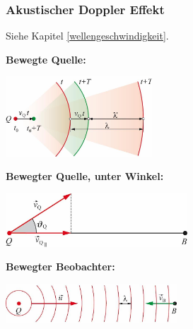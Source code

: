 \subsubsection{Akustischer Doppler Effekt}
 Siehe Kapitel \ref{wellengeschwindigkeit}.
\begin{center}
	\begin{minipage}{0.3\textwidth}
		\textbf{Bewegte Quelle:}\\
	\end{minipage}%
	\begin{minipage}{0.2\textwidth}
		\includegraphics[height=3cm,keepaspectratio=true]{Images/akustischer_doppler_effekt_bewegte_quelle.png}
	\end{minipage}
\end{center}
\begin{center}
	\begin{minipage}{0.2\textwidth}
		\textbf{Bewegter Quelle, unter Winkel:}\\
	\end{minipage}%
	\begin{minipage}{0.3\textwidth}
		\includegraphics[height=2cm,right,keepaspectratio=true]{Images/akustischer_doppler_effekt_bewegte_quelle_unter_winkel.png}
	\end{minipage}
\end{center}
\begin{center}
	\begin{minipage}{0.2\textwidth}
		\textbf{Bewegter Beobachter:}\\
	\end{minipage}%
	\begin{minipage}{0.3\textwidth}
		\includegraphics[height=1.5cm,right,keepaspectratio=true]{Images/akustischer_doppler_effekt_bewegter_beobachter.png}
	\end{minipage}
\end{center}
